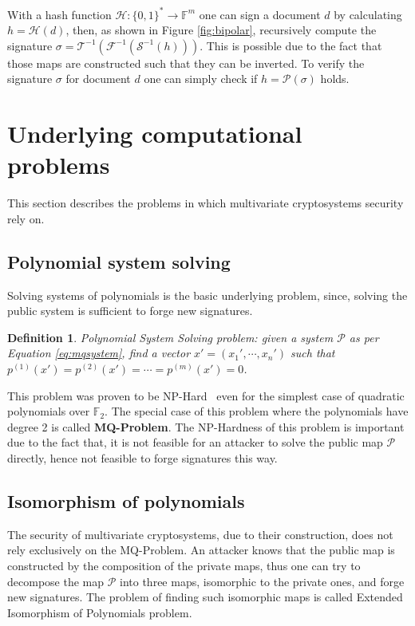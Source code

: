 \documentclass{ufsctex/ufsctex}
\newtheorem{definition}{Definition}
\begin{document}
With a hash function $\mathcal{H}:\{0,1\}^* \to \mathbb{F}^m$ one can sign a
document $d$ by calculating $h = \mathcal{H}(d)$, then, as shown in Figure
\ref{fig:bipolar}, recursively compute the signature $\sigma =
\mathcal{T}^{-1}(\mathcal{F}^{-1}(\mathcal{S}^{-1}(h)))$. This is possible due
to the fact that those maps are constructed such that they can be inverted. To
verify the signature $\sigma$ for document $d$ one can simply check if $h =
\mathcal{P}(\sigma)$ holds.

\section{Underlying computational problems}\label{sec:problems}

This section describes the problems in which multivariate cryptosystems
security rely on.

\subsection{Polynomial system solving}\label{sec:posso}

Solving systems of polynomials is the basic underlying problem, since, solving
the public system is sufficient to forge new signatures.

\begin{definition}
Polynomial System Solving problem: given a system $\mathcal{P}$ as per Equation
\ref{eq:mqsystem}, find a vector $x' = (x_1',\cdots,x_n')$ such that
$p^{(1)}(x') = p^{(2)}(x') = \cdots = p^{(m)}(x') = 0$.
\end{definition}

This problem was proven to be NP-Hard~\cite[Appendix A7.2]{garey1979npc} even
for the simplest case of quadratic polynomials over $\mathbb{F}_2$. The special
case of this problem where the polynomials have degree 2 is called
\textbf{MQ-Problem}. The NP-Hardness of this problem is important due to the
fact that, it is not feasible for an attacker to solve the public map
$\mathcal{P}$ directly, hence not feasible to forge signatures this way.

\subsection{Isomorphism of polynomials}

The security of multivariate cryptosystems, due to their construction, does not
rely exclusively on the MQ-Problem. An attacker knows that the public map is
constructed by the composition of the private maps, thus one can try to
decompose the map $\mathcal{P}$ into three maps, isomorphic to the private
ones, and forge new signatures. The problem of finding such isomorphic maps is
called Extended Isomorphism of Polynomials problem.
\end{document}
